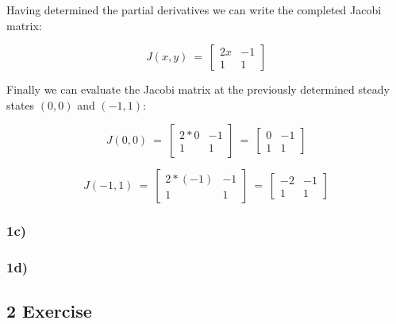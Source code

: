 \documentclass[]{scrartcl}
\begin{document}
Having determined the partial derivatives we can write the completed Jacobi matrix:

\[
J(x,y) ~=~
\begin{bmatrix}
  2x & -1 \\[1ex] %
  1 & 1
\end{bmatrix}
\]

Finally we can evaluate the Jacobi matrix at the previously determined steady states $(0,0)$ and $(-1,1)$:

\[
J(0,0) 
~=~
\begin{bmatrix}
  2*0 & -1 \\[1ex] %
  1 & 1
\end{bmatrix}
~=~
\begin{bmatrix}
  0 & -1 \\[1ex] %
  1 & 1
\end{bmatrix}
\]

\[
J(-1,1) 
~=~
\begin{bmatrix}
  2*(-1) & -1 \\[1ex] %
  1 & 1
\end{bmatrix}
~=~
\begin{bmatrix}
  -2 & -1 \\[1ex] %
  1 & 1
\end{bmatrix}
\]


\subsubsection*{1c)}





\subsubsection*{1d)}






\subsection*{2 Exercise}
\end{document}
